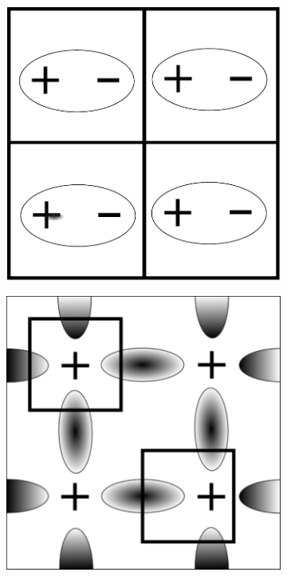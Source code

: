 \begin{figure}[h!]
    \centering
   \captionsetup[sub]{font=small}

    \begin{subfigure}[b!]{0.3 \textwidth}
        \caption{}\vspace*{0.5em}
        \includegraphics[width=\textwidth]{Imagenes/no_cell_selection.pdf}
    \end{subfigure}\hspace*{2em}
    \begin{subfigure}[b!]{0.3 \textwidth}
        \caption{}\vspace*{0.5em}
        \includegraphics[width=\textwidth]{Imagenes/Cell_selection.pdf}

\end{subfigure}
\end{figure}
